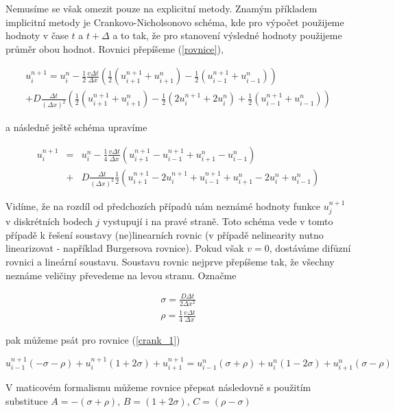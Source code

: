 Nemusíme se však omezit pouze na explicitní metody. Znamým příkladem implicitní 
metody je Crankovo-Nicholsonovo schéma, kde pro výpočet použijeme hodnoty v čase 
$t$ a $t+\Delta$ a to tak, že pro stanovení výsledné hodnoty použijeme průměr obou 
hodnot. Rovnici přepíšeme (\ref{rovnice}),

\begin{eqnarray}
  u_{i}^{n+1}
= u_i^{n}
-   \frac{1}{2}\frac{v\Delta t}{\Delta x}
    \left( \frac{1}{2}(u_{i+1}^{n+1} + u_{i+1}^{n})
-   \frac{1}{2}(u_{i-1}^{n+1} + u_{i-1}^{n}) \right)
\\
+ D \frac{\Delta t}{(\Delta x)^2}
    \left( \frac{1}{2}(u_{i+1}^{n+1} + u_{i+1}^n)
-   \frac{1}{2}(2 u_{i}^{n+1} + 2u_{i}^n)
+   \frac{1}{2}(u_{i-1}^{n+1} + u_{i-1}^n) \right)
\end{eqnarray}

a následně ještě schéma upravíme

\begin{eqnarray}
u_{i}^{n+1} & = & u_i^{n}
- \frac{1}{4}\frac{v\Delta t}{\Delta x}
  (u_{i+1}^{n+1} - u_{i-1}^{n+1} + u_{i+1}^{n} - u_{i-1}^n)
  \\
  \nonumber & + & D \frac{\Delta t}{(\Delta x)^2}
  \frac{1}{2}(u_{i+1}^{n+1}-2u_{i}^{n+1}+u_{i-1}^{n+1}+u_{i+1}^n-2u_i^n+u_{i-1}^n)
\label{crank_1}
\end{eqnarray}

Vidíme, že na rozdíl od předchozích případů nám neznámé hodnoty funkce 
$u_j^{n+1}$ v diskrétních bodech $j$ vystupují i na pravé straně. Toto schéma 
vede v tomto případě k řešení soustavy (ne)linearních rovnic (v případě nelinearity 
nutno linearizovat - například Burgersova rovnice). Pokud však $v=0$, dostáváme 
difůzní rovnici a lineární soustavu. Soustavu rovnic nejprve přepíšeme tak, že 
všechny neznáme veličiny převedeme na levou stranu. Označme

\begin{eqnarray}
\sigma = \frac{D\Delta t}{2\Delta x^2} \\
\rho   = \frac{1}{4}\frac{v\Delta t}{\Delta x}
\end{eqnarray}

pak můžeme psát pro rovnice (\ref{crank_1})

\begin{equation}
  u_{i-1}^{n+1}(-\sigma-\rho) + u_i^{n+1}(1+2\sigma) + u_{i+1}^{n+1}
= u_{i-1}^n(\sigma+\rho) + u_i^{n}(1-2\sigma) + u_{i+1}^{n}(\sigma-\rho)
\end{equation}

V maticovém formalismu můžeme rovnice přepsat následovně s použitím substituce
$A = - (\sigma+\rho)$, $B = (1+2\sigma)$, $C = (\rho-\sigma)$

